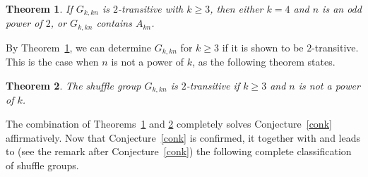 \documentclass[11pt,a4paper,reqno]{amsart}
\newcommand{\A}{A}
\newcommand{\AGL}{\mathrm{AGL}}
\newtheorem{theorem}{Theorem}[section]
\theoremstyle{definition}
\begin{document}
\begin{theorem}\label{thmreduct}
      If $G_{k,kn}$ is $2$-transitive with $k\geq3$, then either $k=4$ and $n$ is an odd power of $2$, or $G_{k,kn}$ contains $\A_{kn}$.
\end{theorem}

By Theorem~\ref{thmreduct}, we can determine $G_{k,kn}$ for $k\geq 3$ if it is shown to be $2$-transitive. This is the case when $n$ is not a power of $k$, as the following theorem states.

\begin{theorem}\label{thm2tran}
  The shuffle group $G_{k,kn}$ is $2$-transitive if $k\geq 3$ and $n$ is not a power of $k$.
\end{theorem}

The combination of Theorems~\ref{thmreduct} and \ref{thm2tran} completely solves Conjecture~\ref{conk} affirmatively.
Now that Conjecture~\ref{conk} is confirmed, it together with \cite[Theorem 2]{MM1987} and \cite[Theorem~2.6]{CHMW2005} leads to (see the remark after Conjecture~\ref{conk}) the following complete classification of shuffle groups.


\end{document}

